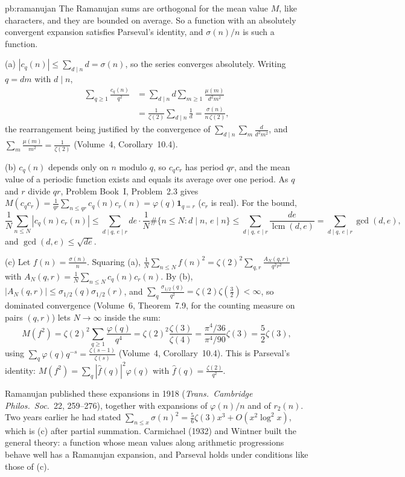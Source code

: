 \begin{solution}{pb:ramanujan}
\idea The Ramanujan sums are orthogonal for the mean value $M$, like characters, and they are bounded on average. So a function with an absolutely convergent
expansion satisfies Parseval's identity, and $\sigma(n)/n$ is such a function.

\writeup (a) $|c_q(n)|\le\sum_{d\mid n}d=\sigma(n)$, so the series converges absolutely. Writing $q=dm$ with $d\mid n$,
\[
\begin{aligned}
\sum_{q\ge1}\frac{c_q(n)}{q^2}&=\sum_{d\mid n}d\sum_{m\ge1}\frac{\mu(m)}{d^2m^2}\\
&=\frac1{\zeta(2)}\sum_{d\mid n}\frac1d=\frac{\sigma(n)}{n\,\zeta(2)},
\end{aligned}
\]
the rearrangement being justified by the convergence of $\sum_{d\mid n}\sum_m\frac d{d^2m^2}$, and $\sum_m\frac{\mu(m)}{m^2}=\frac1{\zeta(2)}$ (Volume~4, Corollary~10.4).

(b) $c_q(n)$ depends only on $n$ modulo $q$, so $c_qc_r$ has period $qr$, and the mean value of a periodic function exists and equals its average over one period. As $q$ and $r$ divide
$qr$, Problem Book~I, Problem~2.3 gives $M(c_qc_r)=\frac1{qr}\sum_{n\le qr}c_q(n)c_r(n)=\varphi(q)\mathbf 1_{q=r}$ ($c_r$ is real). For the bound,
\[
\frac1N\sum_{n\le N}|c_q(n)c_r(n)|\le\sum_{d\mid q,\,e\mid r}de\cdot\frac1N\#\{n\le N:d\mid n,\,e\mid n\}\le\sum_{d\mid q,\,e\mid r}\frac{de}{\operatorname{lcm}(d,e)}=\sum_{d\mid q,\,e\mid r}\gcd(d,e),
\]
and $\gcd(d,e)\le\sqrt{de}$.

(c) Let $f(n)=\frac{\sigma(n)}n$. Squaring (a), $\frac1N\sum_{n\le N}f(n)^2=\zeta(2)^2\sum_{q,r}\frac{A_N(q,r)}{q^2r^2}$ with $A_N(q,r)=\frac1N\sum_{n\le N}c_q(n)c_r(n)$. By (b),
$|A_N(q,r)|\le\sigma_{1/2}(q)\sigma_{1/2}(r)$, and $\sum_q\frac{\sigma_{1/2}(q)}{q^2}=\zeta(2)\zeta(\frac32)<\infty$, so dominated convergence (Volume~6, Theorem~7.9, for the counting measure on pairs
$(q,r)$) lets $N\to\infty$ inside the sum:
\[
M(f^2)=\zeta(2)^2\sum_{q\ge1}\frac{\varphi(q)}{q^4}=\zeta(2)^2\frac{\zeta(3)}{\zeta(4)}=\frac{\pi^4/36}{\pi^4/90}\zeta(3)=\frac52\zeta(3),
\]
using $\sum_q\varphi(q)q^{-s}=\frac{\zeta(s-1)}{\zeta(s)}$ (Volume~4, Corollary~10.4). This is Parseval's identity: $M(f^2)=\sum_q|\hat f(q)|^2\varphi(q)$ with $\hat f(q)=\frac{\zeta(2)}{q^2}$.

\leads Ramanujan published these expansions in 1918 (\emph{Trans.\ Cambridge Philos.\ Soc.}\ 22, 259--276), together with expansions of $\varphi(n)/n$ and of $r_2(n)$. Two years
earlier he had stated $\sum_{n\le x}\sigma(n)^2=\frac56\zeta(3)x^3+O(x^2\log^2x)$, which is (c) after partial summation. Carmichael (1932) and Wintner built the general theory: a
function whose mean values along arithmetic progressions behave well has a Ramanujan expansion, and Parseval holds under conditions like those of (c).
\end{solution}

